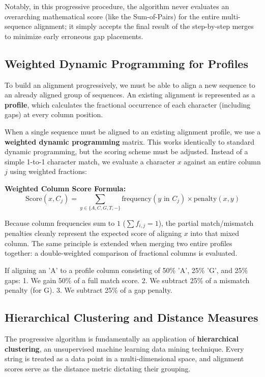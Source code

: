\sta Notably, in this progressive procedure, the algorithm never evaluates an overarching mathematical score (like the Sum-of-Pairs) for the entire multi-sequence alignment; it simply accepts the final result of the step-by-step merges to minimize early erroneous gap placements.

\subsection{Weighted Dynamic Programming for Profiles}
To build an alignment progressively, we must be able to align a new sequence to an already aligned group of sequences. An existing alignment is represented as a \textbf{profile}, which calculates the fractional occurrence of each character (including gaps) at every column position.

When a single sequence must be aligned to an existing alignment profile, we use a \textbf{weighted dynamic programming} matrix. This works identically to standard dynamic programming, but the scoring scheme must be adjusted. Instead of a simple 1-to-1 character match, we evaluate a character $x$ against an entire column $j$ using weighted fractions:

\begin{important}
  \textbf{Weighted Column Score Formula:}
  \[
  \text{Score}(x, C_j) = \sum_{y \in \{A,C,G,T,-\}} \text{frequency}(y \text{ in } C_j) \times \text{penalty}(x, y)
  \]
\end{important}

Because column frequencies sum to $1$ ($\sum f_{i,j} = 1$), the partial match/mismatch penalties cleanly represent the expected score of aligning $x$ into that mixed column. The same principle is extended when merging two entire profiles together: a double-weighted comparison of fractional columns is evaluated.

If aligning an 'A' to a profile column consisting of 50\% 'A', 25\% 'G', and 25\% gaps:
1. We gain 50\% of a full match score.
2. We subtract 25\% of a mismatch penalty (for G).
3. We subtract 25\% of a gap penalty.

\subsection{Hierarchical Clustering and Distance Measures}
The progressive algorithm is fundamentally an application of \textbf{hierarchical clustering}, an unsupervised machine learning data mining technique. Every string is treated as a data point in a multi-dimensional space, and alignment scores serve as the distance metric dictating their grouping.

